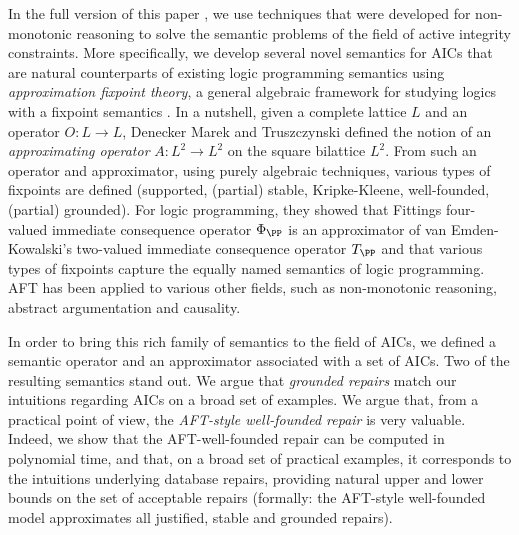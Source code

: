 \documentclass[runningheads]{llncs}
\begin{document}
In the full version of this paper , we use techniques that were developed for non-monotonic reasoning to solve the semantic problems of the field of active integrity constraints. 
More specifically, we develop several novel semantics for AICs that are natural counterparts of existing logic programming semantics using \emph{approximation fixpoint theory}, a general algebraic framework for studying logics with a fixpoint semantics \cite{DeneckerMT00}.
In a nutshell, given a complete lattice $L$ and an operator $O:L\to L$, Denecker Marek and Truszczynski \cite{DeneckerMT00} defined the notion of an \emph{approximating operator} $A: L^2\to L^2$ on the square bilattice $L^2$. 
From such an operator and approximator, using purely algebraic techniques, various types of fixpoints are defined (supported, (partial) stable, Kripke-Kleene, well-founded, (partial) grounded). 
For logic programming, they showed that Fittings four-valued immediate consequence operator $\Phi_\PP$ is an approximator of van Emden-Kowalski's two-valued immediate consequence operator $T_\PP$ and that various types of fixpoints capture the equally named semantics of logic programming.
AFT has been applied to various other fields, such as non-monotonic reasoning, abstract argumentation and causality. 

In order to bring this rich family of semantics to the field of AICs, we defined a semantic operator and an approximator associated with a set of AICs. Two of the resulting semantics stand out.
We argue that \emph{grounded repairs} match our intuitions regarding AICs on a broad set of examples. 
We argue that, from a practical point of view, the \emph{AFT-style well-founded repair} is very valuable. 
Indeed, we show that the AFT-well-founded repair can be computed in polynomial time, and that, on a broad set of practical examples, it corresponds to the intuitions underlying database repairs,  providing natural upper and lower bounds on the set of acceptable repairs (formally: the AFT-style well-founded model approximates all justified, stable and grounded repairs).
\end{document}
